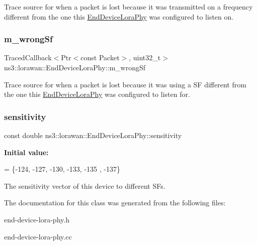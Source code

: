 Trace source for when a packet is lost because it was transmitted on a frequency different from the one this \hyperlink{classns3_1_1lorawan_1_1EndDeviceLoraPhy}{End\+Device\+Lora\+Phy} was configured to listen on. \mbox{\label{classns3_1_1lorawan_1_1EndDeviceLoraPhy_ac3e0c1c101ab697a724622598ae208fa}} 
\subsubsection{\texorpdfstring{m\+\_\+wrong\+Sf}{m\_wrongSf}}
{\footnotesize\ttfamily Traced\+Callback$<$Ptr$<$const Packet$>$, uint32\+\_\+t$>$ ns3\+::lorawan\+::\+End\+Device\+Lora\+Phy\+::m\+\_\+wrong\+Sf\hspace{0.3cm}{\ttfamily [protected]}}

Trace source for when a packet is lost because it was using a SF different from the one this \hyperlink{classns3_1_1lorawan_1_1EndDeviceLoraPhy}{End\+Device\+Lora\+Phy} was configured to listen for. \mbox{\label{classns3_1_1lorawan_1_1EndDeviceLoraPhy_a5fdf969286bc2cd6b357daf10122c759}} 
\subsubsection{\texorpdfstring{sensitivity}{sensitivity}}
{\footnotesize\ttfamily const double ns3\+::lorawan\+::\+End\+Device\+Lora\+Phy\+::sensitivity\hspace{0.3cm}{\ttfamily [static]}}

{\bfseries Initial value\+:}
\begin{DoxyCode}
= \{-124, -127, -130,
                                                                                                 -133, -135
      , -137\}
\end{DoxyCode}


The sensitivity vector of this device to different S\+Fs. 



The documentation for this class was generated from the following files\+:\begin{DoxyCompactItemize}
\item 
end-\/device-\/lora-\/phy.\+h\item 
end-\/device-\/lora-\/phy.\+cc\end{DoxyCompactItemize}
